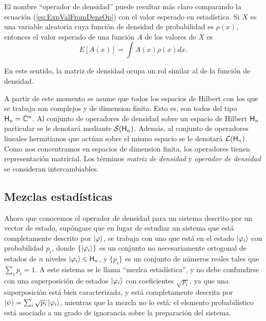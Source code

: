 El nombre ``operador de densidad'' puede resultar más claro comparando la ecuación (\ref{eq:ExpValFromDensOp}) con el valor esperado en estadística. Si $X$ es una variable aleatoria cuya función de densidad de probabilidad es $\rho(x)$, entonces el valor esperado de una función $A$ de los valores de $X$ es
\begin{equation*}
E[A(x)]=\int A(x) \rho(x) dx.
\end{equation*}

En este sentido, la matriz de densidad ocupa un rol similar al de la función de densidad.

A partir de este momento se asume que todos los espacios de Hilbert con los que se trabaja son complejos y de dimension finita. Esto es, son todos del tipo ${\sf H}_{n}=\mathbb{C}^{n}$. Al conjunto de operadores de densidad sobre un espacio de Hilbert ${\sf H}_{n}$ particular se le denotará mediante $\mathcal{S}({\sf H}_{n})$. Además, al conjunto de operadores lineales hermitianos que actúan sobre el mismo espacio se le denotará $\mathcal{L}({\sf H}_{n})$. Como nos concentramos en espacios de dimension finita, los operadores tienen representación matricial. Los términos \textit{matriz de densidad} y \textit{operador de densidad} se consideran intercambiables. 

\subsection{Mezclas estadísticas}

Ahora que conocemos el operador de densidad para un sistema descrito por un vector de estado, supóngase que en lugar de estudiar un sistema que está completamente descrito por $\ket{\varphi}$, se trabaja con uno que está en el estado $\ket{\varphi_{i}}$ con probabilidad $p_{i}$, donde $\{\ket{\varphi_{i}}\}$ es un conjunto no necesariamente ortogonal de estados de $n$ niveles $\ket{\varphi_{i}}\in{\sf H}_{n}$, y $\{p_{i}\}$ es un conjunto de números reales tales que $\sum_{i}p_{i}=1$. A este sistema se le llama ``mezlca estadística'', y no debe confundirse con una superposición de estados $\ket{\varphi_{i}}$ con coeficientes $\sqrt{p_{i}}$, ya que una superposición está bien caracterizada, y está completamente descrita por $\ket{\psi}=\sum_{i}\sqrt{p_{i}}\ket{\varphi_{i}}$, mientras que la mezcla no lo está: el elemento probabilístico está asociado a un grado de ignorancia sobre la preparación del sistema.


